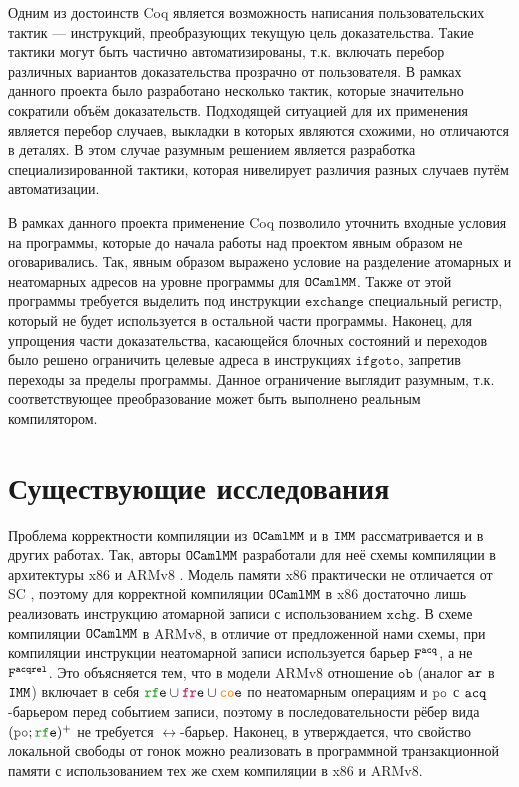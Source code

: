 Одним из достоинств Coq является возможность написания пользовательских тактик --- инструкций, преобразующих текущую цель доказательства. Такие тактики могут быть частично автоматизированы, т.к. включать перебор различных вариантов доказательства прозрачно от пользователя. В рамках данного проекта было разработано несколько тактик, которые значительно сократили объём доказательств. Подходящей ситуацией для их применения является перебор случаев, выкладки в которых являются схожими, но отличаются в деталях. В этом случае разумным решением является разработка специализированной тактики, которая нивелирует различия разных случаев путём автоматизации.

В рамках данного проекта применение Coq позволило уточнить входные условия на программы, которые до начала работы над проектом явным образом не оговаривались. Так, явным образом выражено условие на разделение атомарных и неатомарных адресов на уровне программы для $\mathtt{OCaml}\allowbreak \mathtt{MM}$. Также от этой программы  требуется выделить под инструкции $\mathtt{exchange}$ специальный регистр, который не будет используется в остальной части программы. Наконец, для упрощения части доказательства, касающейся блочных состояний и переходов было решено ограничить целевые адреса в инструкциях $\mathtt{ifgoto}$, запретив переходы за пределы программы. Данное ограничение выглядит разумным, т.к. соответствующее преобразование может быть выполнено реальным компилятором.


\section{Существующие исследования}
\label{related-work}

Проблема корректности компиляции из $\mathtt{OCaml}\allowbreak \mathtt{MM}$ и в $\mathtt{IMM}$ рассматривается и в других работах. Так, авторы $\mathtt{OCaml}\allowbreak \mathtt{MM}$ \cite{omm} разработали для неё схемы компиляции в архитектуры x86 и ARMv8 \cite{arm}. Модель памяти x86 практически не отличается от SC \cite{x86-reorderings}, поэтому для корректной компиляции $\mathtt{OCaml}\allowbreak \mathtt{MM}$ в x86 достаточно лишь реализовать инструкцию атомарной записи с использованием $\mathtt{xchg}$. В схеме компиляции $\mathtt{OCaml}\allowbreak \mathtt{MM}$ в ARMv8, в отличие от предложенной нами схемы, при компиляции инструкции неатомарной записи используется барьер ${\mathtt{F}}^{{\mathtt{acq}}}$, а не ${\mathtt{F}}^{{\mathtt{acqrel}}}$. Это объясняется тем, что в модели ARMv8 отношение $\mathtt{ob}$ (аналог $\lAR$ в $\mathtt{IMM}$) включает в себя $\lRFE \cup \lFRE \cup \lCOE$ по неатомарным операциям и $\lPO$ с ${\mathtt{acq}}$-барьером перед событием записи, поэтому в последовательности рёбер вида $(\lPO;\lRFE)^{+}$ не требуется $\rel$-барьер. Наконец, в \cite{omm-stm} утверждается, что свойство локальной свободы от гонок можно реализовать в программной транзакционной памяти с использованием тех же схем компиляции в x86 и ARMv8.


